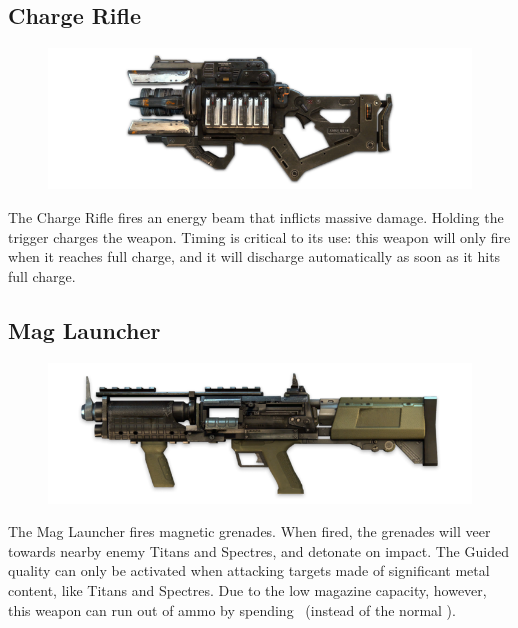 \documentclass[9pt, openany]{extbook}
\begin{document}
\subsection{Charge Rifle}
\begin{figure}
\vspace*{-2em}
\includegraphics[width=\linewidth]{ChargeRifle}
\end{figure}

The Charge Rifle fires an energy beam that inflicts massive damage. Holding the trigger charges the weapon. Timing is critical to its use: this weapon will only fire when it reaches full charge, and it will discharge automatically as soon as it hits full charge.



\subsection{Mag Launcher}
\begin{figure}
\vspace*{-2em}
\includegraphics[width=\linewidth]{MagLauncher}
\end{figure}


The Mag Launcher fires magnetic grenades. When fired, the grenades will veer towards nearby enemy Titans and Spectres, and detonate on impact. The Guided quality can only be activated when attacking targets made of significant metal content, like Titans and Spectres. Due to the low magazine capacity, however, this weapon can run out of ammo by spending \Threat\Threat\Threat\ (instead of the normal \Despair).
\end{document}
